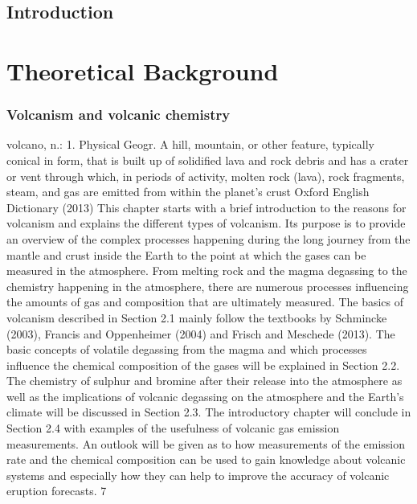 \documentclass  [
  paper    = a4,
  BCOR     = 10mm,
  twoside,
  fontsize = 12pt,
  fleqn,
  toc      = bibnumbered,
  toc      = listofnumbered,
  numbers  = noendperiod,
  headings = normal,
  listof   = leveldown,
  version  = 3.03
]                                       {scrreprt}
\begin{document}
  

  \tableofcontents
	\chapter{Introduction}	
	
	\part{Theoretical Background}
	\section{Volcanism and volcanic chemistry}

	volcano, n.: 1. Physical Geogr. A hill, mountain, or other feature, typically
	conical in form, that is built up of solidified lava and rock debris and has a crater
	or vent through which, in periods of activity, molten rock (lava), rock fragments,
	steam, and gas are emitted from within the planet’s crust
	Oxford English Dictionary (2013)
	This chapter starts with a brief introduction to the reasons for volcanism and
	explains the different types of volcanism. Its purpose is to provide an overview
	of the complex processes happening during the long journey from the mantle
	and crust inside the Earth to the point at which the gases can be measured in
	the atmosphere.
	From melting rock and the magma degassing to the chemistry happening in
	the atmosphere, there are numerous processes influencing the amounts of gas and
	composition that are ultimately measured. The basics of volcanism described
	in Section 2.1 mainly follow the textbooks by Schmincke (2003), Francis and
	Oppenheimer (2004) and Frisch and Meschede (2013). The basic concepts of
	volatile degassing from the magma and which processes influence the chemical
	composition of the gases will be explained in Section 2.2. The chemistry of
	sulphur and bromine after their release into the atmosphere as well as the
	implications of volcanic degassing on the atmosphere and the Earth’s climate will
	be discussed in Section 2.3. The introductory chapter will conclude in Section 2.4
	with examples of the usefulness of volcanic gas emission measurements. An
	outlook will be given as to how measurements of the  emission rate and the
	chemical composition can be used to gain knowledge about volcanic systems
	and especially how they can help to improve the accuracy of volcanic eruption
	forecasts.
	7
\end{document}

